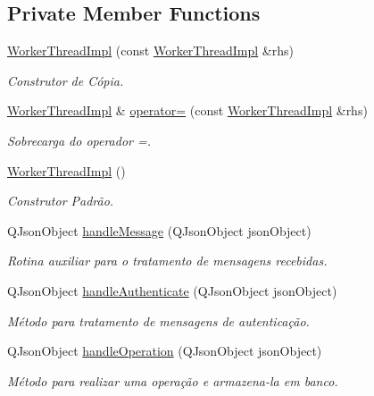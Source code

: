 \subsection*{Private Member Functions}
\begin{DoxyCompactItemize}
\item 
\hyperlink{classWorkerThreadImpl_adebf1655473918cb3ff77fbac14ca7d3}{Worker\+Thread\+Impl} (const \hyperlink{classWorkerThreadImpl}{Worker\+Thread\+Impl} \&rhs)
\begin{DoxyCompactList}\small\item\em Construtor de Cópia. \end{DoxyCompactList}\item 
\hyperlink{classWorkerThreadImpl}{Worker\+Thread\+Impl} \& \hyperlink{classWorkerThreadImpl_a20a17134c17a8832fe6a59220d801dd0}{operator=} (const \hyperlink{classWorkerThreadImpl}{Worker\+Thread\+Impl} \&rhs)
\begin{DoxyCompactList}\small\item\em Sobrecarga do operador =. \end{DoxyCompactList}\item 
\hyperlink{classWorkerThreadImpl_a6656b99702598782c9c49ee9e4437388}{Worker\+Thread\+Impl} ()
\begin{DoxyCompactList}\small\item\em Construtor Padrão. \end{DoxyCompactList}\item 
Q\+Json\+Object \hyperlink{classWorkerThreadImpl_ac1ced60fd043f7dca8a7e7e1857a91cb}{handle\+Message} (Q\+Json\+Object json\+Object)
\begin{DoxyCompactList}\small\item\em Rotina auxiliar para o tratamento de mensagens recebidas. \end{DoxyCompactList}\item 
Q\+Json\+Object \hyperlink{classWorkerThreadImpl_a72b7f275f170171a49725a508e071f71}{handle\+Authenticate} (Q\+Json\+Object json\+Object)
\begin{DoxyCompactList}\small\item\em Método para tratamento de mensagens de autenticação. \end{DoxyCompactList}\item 
Q\+Json\+Object \hyperlink{classWorkerThreadImpl_a0bcd0f706b49530ccaf7f3fc21bded7c}{handle\+Operation} (Q\+Json\+Object json\+Object)
\begin{DoxyCompactList}\small\item\em Método para realizar uma operação e armazena-\/la em banco. \end{DoxyCompactList}\item 

\end{DoxyCompactItemize}
